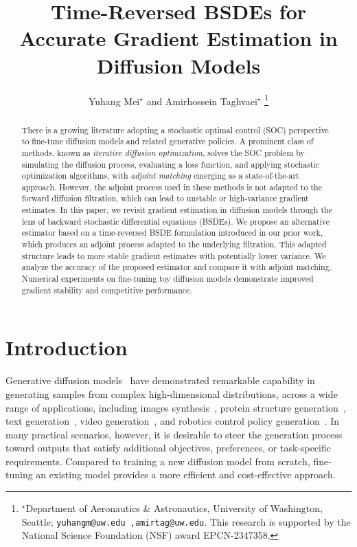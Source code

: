 \documentclass[letterpaper, 10 pt, conference]{ieeeconf}  %
\title{\LARGE \bf
Time-Reversed BSDEs for Accurate Gradient Estimation in\\ Diffusion Models
}
\author{
Yuhang Mei$^\star$ and
Amirhossein Taghvaei$^\star$
  {\thanks{$^\star$Department of Aeronautics \& Astronautics, University of Washington, Seattle; {\tt\small yuhangm@uw.edu ,amirtag@uw.edu}. This research is supported by the National Science Foundation (NSF) award EPCN-2347358.}}
}
\begin{document}
\maketitle
\thispagestyle{empty}
\pagestyle{empty}


\begin{abstract}
There is a growing literature adopting a stochastic optimal control (SOC) perspective to fine-tune diffusion models and related generative policies. A prominent class of methods, known as \emph{iterative diffusion optimization}, solves the SOC problem by simulating the diffusion process, evaluating a loss function, and applying stochastic optimization algorithms, with \emph{adjoint matching} emerging as a state-of-the-art approach. However, the adjoint process used in these methods is  not adapted to the forward diffusion filtration, which can lead to unstable or high-variance gradient estimates.
In this paper, we revisit gradient estimation in diffusion models through the lens of backward stochastic differential equations (BSDEs). We propose an alternative estimator based on a time-reversed BSDE formulation introduced in our prior work, which produces an adjoint process adapted to the underlying filtration. This adapted structure leads to more stable gradient estimates with potentially lower variance.
We analyze the accuracy of the proposed estimator and compare it with adjoint matching. Numerical experiments on fine-tuning toy diffusion models demonstrate improved gradient stability and competitive performance.
\end{abstract}


\section{Introduction}
\label{sec:introduction}
Generative diffusion models~\cite{song2019generative,ho2020denoising,songscore2021score} have demonstrated remarkable capability in generating samples from complex high-dimensional distributions, across a wide range of applications, including images synthesis~\cite{rombach2022high},
protein structure generation~\cite{watson2023novo}, 
text generation~\cite{li2022diffusion}, 
video generation~\cite{ho2022video},
and robotics control policy generation~\cite{chi2025diffusion}. In many practical scenarios, however, it is desirable to steer the generation process toward outputs that satisfy additional objectives, preferences, or task-specific requirements. Compared to training a new diffusion model from scratch, fine-tuning an existing model provides a  more efficient and cost-effective approach. 
\end{document}
